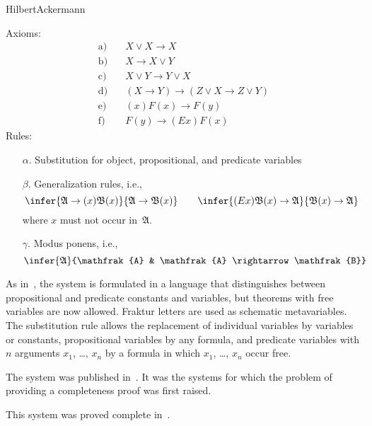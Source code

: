 \calculusAcronym{}



\maketitle

\begin{entry}{HilbertAckermann}  

\begin{calculus}
Axioms:
\begin{align*}
\text{a)} \quad & X \lor X \rightarrow X \\
\text{b)} \quad & X \rightarrow X \lor Y \\
\text{c)} \quad & X \lor Y \rightarrow Y \lor X\\
\text{d)} \quad & (X \rightarrow Y) \rightarrow (Z \lor X \rightarrow Z \lor Y)\\
\text{e)} \quad & (x)F(x) \rightarrow F(y)\\
\text{f)} \quad & F(y) \rightarrow (Ex)F(x)
\end{align*}
Rules:
\begin{enumerate}
\item[$\alpha$.] Substitution for object, propositional, and predicate variables
\item[$\beta$.] Generalization rules, i.e.,
\[
\infer{\mathfrak{A} \rightarrow (x)\mathfrak{B}(x)}{\mathfrak{A} \rightarrow \mathfrak{B}(x)}
\qquad
\infer{(Ex)\mathfrak{B}(x) \rightarrow \mathfrak{A}}{\mathfrak{B}(x) \rightarrow \mathfrak{A}}
\]
where $x$ must not occur in~$\mathfrak{A}$.
\item[$\gamma$.] Modus ponens, i.e.,
\[
\infer{\mathfrak{A}}{\mathfrak{A} & \mathfrak{A} \rightarrow \mathfrak{B}}
\]
\end{enumerate}

\end{calculus}

\begin{clarifications}
  As in~, the system is formulated in a language that distinguishes
  between propositional and predicate constants and variables, but theorems with
  free variables are now allowed. Fraktur letters are used as schematic
  metavariables. The substitution rule allows the replacement of individual
  variables by variables or constants, propositional variables by any formula, and
  predicate variables with $n$ arguments $x_1$, \dots, $x_n$ by a formula in which
  $x_1$, \dots, $x_n$ occur free.
\end{clarifications}

\begin{history}
  The system was published in~\cite{HilbertAckermann1928}. It was the
  systems for which the problem of providing a completeness proof was
  first raised.
\end{history}

\begin{technicalities}
  This system was proved complete in~\cite{Godel1930}.
\end{technicalities}

\end{entry}
